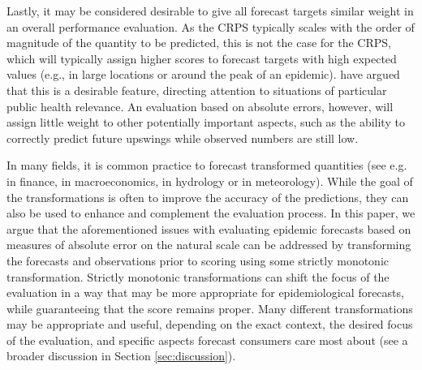 \documentclass[10pt,letterpaper]{article} %
\begin{document}
Lastly, it may be considered desirable to give all forecast targets similar weight in an overall performance evaluation. As the CRPS typically scales with the order of magnitude of the quantity to be predicted, this is not the case for the CRPS, which will typically assign higher scores to forecast targets with high expected values (e.g., in large locations or around the peak of an epidemic). \cite{bracherEvaluatingEpidemicForecasts2021} have argued that this is a desirable feature, directing attention to situations of particular public health relevance. An evaluation based on absolute errors, however, will assign little weight to other potentially important aspects, such as the ability to correctly predict future upswings while observed numbers are still low. 

In many fields, it is common practice to forecast transformed quantities (see e.g. \cite{taylorEvaluatingVolatilityInterval1999} in finance, \cite{mayrLogLevelVAR2015} in macroeconomics, \cite{loweStochasticRainfallrunoffForecasting2014} in hydrology or \cite{fuglstadDoesNonstationarySpatial2015} in meteorology). While the goal of the transformations is often to improve the accuracy of the predictions, they can also be used to enhance and complement the evaluation process. 
In this paper, we argue that the aforementioned issues with evaluating epidemic forecasts based on measures of absolute error on the natural scale can be addressed by transforming the forecasts and observations prior to scoring using some strictly monotonic transformation. Strictly monotonic transformations can shift the focus of the evaluation in a way that may be more appropriate for epidemiological forecasts, while guaranteeing that the score remains proper. Many different transformations may be appropriate and useful, depending on the exact context, the desired focus of the evaluation, and specific aspects forecast consumers care most about (see a broader discussion in Section \ref{sec:discussion}). 
\end{document}
